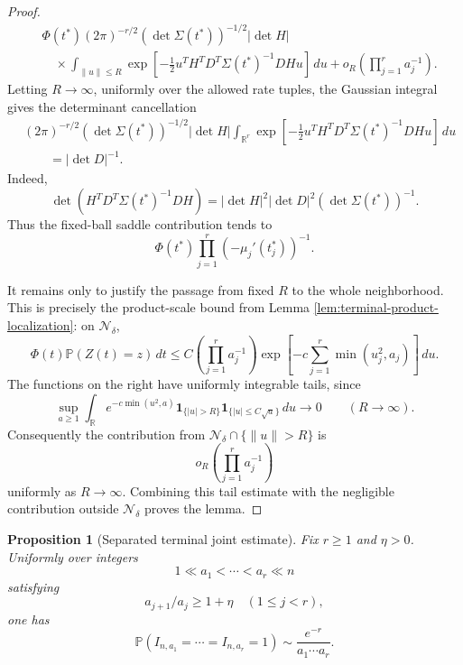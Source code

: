 \documentclass[11pt]{article}
\newtheorem{proposition}[theorem]{Proposition}
\theoremstyle{remark}
\newcommand{\Pp}{\mathbb P}
\newcommand{\one}{\mathbf 1}
\newcommand{\dd}{\,d}
\begin{document}
\begin{proof}
\[
\begin{aligned}
        &\Phi(t^*)(2\pi)^{-r/2}(\det\Sigma(t^*))^{-1/2}|\det H| \\
        &\quad\times
        \int_{\|u\|\le R}
        \exp\left[-\frac12 u^TH^TD^T\Sigma(t^*)^{-1}DHu\right]
        \dd u
        +o_R\left(\prod_{j=1}^r a_j^{-1}\right).
\end{aligned}
\]
Letting \(R\to\infty\), uniformly over the allowed rate tuples, the Gaussian integral gives the determinant cancellation
\[
\begin{aligned}
&(2\pi)^{-r/2}(\det\Sigma(t^*))^{-1/2}|\det H|
 \int_{\mathbb R^r}
        \exp\left[-\frac12 u^TH^TD^T\Sigma(t^*)^{-1}DHu\right]\dd u  \\
&\qquad = |\det D|^{-1}.
\end{aligned}
\]
Indeed,
\[
        \det(H^TD^T\Sigma(t^*)^{-1}DH)
        =|\det H|^2|\det D|^2(\det\Sigma(t^*))^{-1}.
\]
Thus the fixed-ball saddle contribution tends to
\[
        \Phi(t^*)\prod_{j=1}^r(-\mu_j'(t_j^*))^{-1}.
\]

It remains only to justify the passage from fixed \(R\) to the whole neighborhood.  This is precisely the product-scale bound from Lemma \ref{lem:terminal-product-localization}: on \(\mathcal N_\delta\),
\[
        \Phi(t)\Pp(Z(t)=z)\dd t
        \le C\left(\prod_{j=1}^r a_j^{-1}\right)
        \exp\left[-c\sum_{j=1}^r\min(u_j^2,a_j)\right]\dd u .
\]
The functions on the right have uniformly integrable tails, since
\[
        \sup_{a\ge1}\int_{\mathbb R}e^{-c\min(u^2,a)}
        \one_{\{|u|>R\}}\one_{\{|u|\le C\sqrt a\}}\dd u\to0
        \qquad (R\to\infty).
\]
Consequently the contribution from \(\mathcal N_\delta\cap\{\|u\|>R\}\) is
\[
        o_R\left(\prod_{j=1}^r a_j^{-1}\right)
\]
uniformly as \(R\to\infty\).  Combining this tail estimate with the negligible contribution outside \(\mathcal N_\delta\) proves the lemma.
\end{proof}

\begin{proposition}[Separated terminal joint estimate]\label{prop:suk-joint}
Fix \(r\ge1\) and \(\eta>0\).  Uniformly over integers
\[
        1\ll a_1<\cdots<a_r\ll n
\]
satisfying
\[
        a_{j+1}/a_j\ge 1+\eta \quad (1\le j<r),
\]
one has
\[
        \Pp(I_{n,a_1}=\cdots=I_{n,a_r}=1)
        \sim \frac{e^{-r}}{a_1\cdots a_r}.
\]
\end{proposition}
\end{document}
